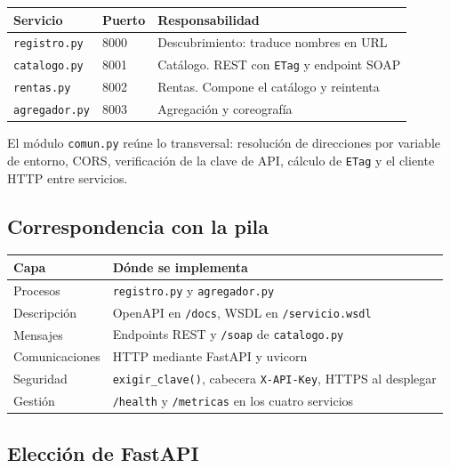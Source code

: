 \documentclass[12pt]{article}
\begin{document}
\begin{center}
\begin{tabular}{lll}
\toprule
\textbf{Servicio} & \textbf{Puerto} & \textbf{Responsabilidad} \\
\midrule
\texttt{registro.py}   & 8000 & Descubrimiento: traduce nombres en URL \\
\texttt{catalogo.py}   & 8001 & Catálogo. REST con \texttt{ETag} y endpoint SOAP \\
\texttt{rentas.py}     & 8002 & Rentas. Compone el catálogo y reintenta \\
\texttt{agregador.py}  & 8003 & Agregación y coreografía \\
\bottomrule
\end{tabular}
\end{center}

El módulo \texttt{comun.py} reúne lo transversal: resolución de direcciones por variable de entorno, CORS, verificación de la clave de API, cálculo de \texttt{ETag} y el cliente HTTP entre servicios.

\subsection{Correspondencia con la pila}

\begin{center}
\begin{tabular}{ll}
\toprule
\textbf{Capa} & \textbf{Dónde se implementa} \\
\midrule
Procesos      & \texttt{registro.py} y \texttt{agregador.py} \\
Descripción   & OpenAPI en \texttt{/docs}, WSDL en \texttt{/servicio.wsdl} \\
Mensajes      & Endpoints REST y \texttt{/soap} de \texttt{catalogo.py} \\
Comunicaciones& HTTP mediante FastAPI y uvicorn \\
Seguridad     & \texttt{exigir\_clave()}, cabecera \texttt{X-API-Key}, HTTPS al desplegar \\
Gestión       & \texttt{/health} y \texttt{/metricas} en los cuatro servicios \\
\bottomrule
\end{tabular}
\end{center}

\subsection{Elección de FastAPI}
\end{document}
